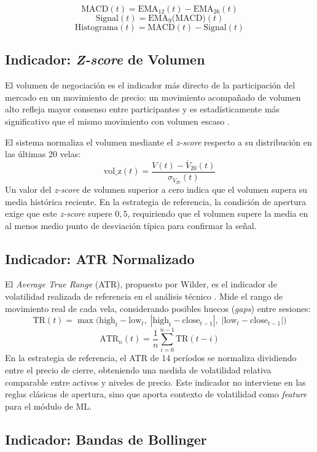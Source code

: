 $$\text{MACD}(t) = \text{EMA}_{12}(t) - \text{EMA}_{26}(t)$$
$$\text{Signal}(t) = \text{EMA}_9\bigl(\text{MACD}\bigr)(t)$$
$$\text{Histograma}(t) = \text{MACD}(t) - \text{Signal}(t)$$

\subsection{Indicador: \textit{Z-score} de Volumen}

El volumen de negociación es el indicador más directo de la participación del mercado en un movimiento de precio: un movimiento acompañado de volumen alto refleja mayor consenso entre participantes y es estadísticamente más significativo que el mismo movimiento con volumen escaso \parencite{murphy_technical_1999}.

El sistema normaliza el volumen mediante el \textit{z-score} respecto a su distribución en las últimas 20 velas: $$\text{vol\_z}(t) = \frac{V(t) - \overline{V}_{20}(t)}{\sigma_{V_{20}}(t)}$$ Un valor del \textit{z-score} de volumen superior a cero indica que el volumen supera su media histórica reciente. En la estrategia de referencia, la condición de apertura exige que este \textit{z-score} supere $0{,}5$, requiriendo que el volumen supere la media en al menos medio punto de desviación típica para confirmar la señal.

\subsection{Indicador: ATR Normalizado}

El \textit{Average True Range} (ATR), propuesto por Wilder, es el indicador de volatilidad realizada de referencia en el análisis técnico \parencite{murphy_technical_1999}. Mide el rango de movimiento real de cada vela, considerando posibles huecos (\textit{gaps}) entre sesiones: $$\text{TR}(t) = \max\bigl(\text{high}_t - \text{low}_t,\;|\text{high}_t - \text{close}_{t-1}|,\; |\text{low}_t - \text{close}_{t-1}|\bigr)$$ $$\text{ATR}_n(t) = \frac{1}{n}\sum_{i=0}^{n-1}\text{TR}(t-i)$$ En la estrategia de referencia, el ATR de 14 períodos se normaliza dividiendo entre el precio de cierre, obteniendo una medida de volatilidad relativa comparable entre activos y niveles de precio. Este indicador no interviene en las reglas clásicas de apertura, sino que aporta contexto de volatilidad como \textit{feature} para el módulo de ML.

\subsection{Indicador: Bandas de Bollinger}

